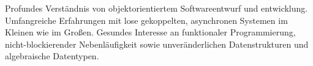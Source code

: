 {
  Profundes Verständnis von objektorientiertem Softwareentwurf und entwicklung.
  Umfangreiche Erfahrungen mit lose gekoppelten, asynchronen Systemen im Kleinen wie im Großen.
  Gesundes Interesse an funktionaler Programmierung, nicht-blockierender Nebenläufigkeit
  sowie unveränderlichen Datenstrukturen und algebraische Datentypen.
}
